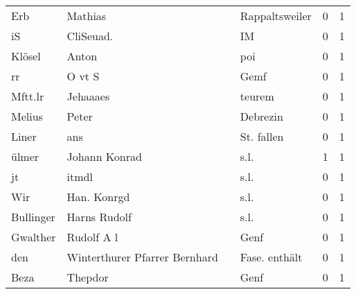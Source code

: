 \begin{center}
\begin{tiny}
\begin{longtabu}{llllrr}
                      Erb &                            Mathias &             &                              Rappaltsweiler &          0 &         1 \\
                       iS &                          CliSeuad. &             &                                          IM &          0 &         1 \\
                   Klösel &                              Anton &             &                                         poi &          0 &         1 \\
                       rr &                             O vt S &             &                                        Gemf &          0 &         1 \\
                  Mftt.lr &                           Jehaaaes &             &                                      teurem &          0 &         1 \\
                   Melius &                              Peter &             &                                    Debrezin &          0 &         1 \\
                    Liner &                                ans &             &                                  St. fallen &          0 &         1 \\
                    ülmer &                      Johann Konrad &             &                                        s.l. &          1 &         1 \\
                       jt &                              itmdl &             &                                        s.l. &          0 &         1 \\
                      Wir &                        Han. Konrgd &             &                                        s.l. &          0 &         1 \\
                Bullinger &                       Harns Rudolf &             &                                        s.l. &          0 &         1 \\
                 Gwalther &                         Rudolf A l &             &                                        Genf &          0 &         1 \\
                      den &      Winterthurer Pfarrer Bernhard &             &                               Fase. enthält &          0 &         1 \\
                     Beza &                            Thepdor &             &                                        Genf &          0 &         1 \\

\end{longtabu}
\end{tiny}
\end{center}
